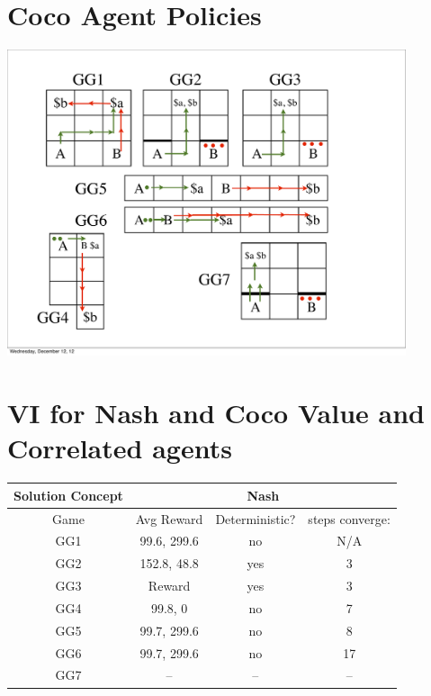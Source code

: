 \section{Coco Agent Policies}
\includegraphics[height=90mm]{text/games.pdf}

\section{VI for Nash and Coco Value  and Correlated agents}
\hspace{5mm}\begin{tabular}{||c||c|c|c||}
	\hline
	Solution Concept&  \multicolumn{3}{|c||}{Nash} \\ \hline
	Game & Avg Reward & Deterministic? & steps converge:  \\ \hline \hline
	GG1 & 99.6, 299.6 & no & N/A  \\ \hline
	GG2 & 152.8, 48.8 & yes & 3  \\ \hline
	GG3 & Reward & yes & 3 \\ \hline
	GG4 & 99.8, 0 & no & 7 \\ \hline
	GG5 & 99.7, 299.6 & no & 8 \\ \hline
	GG6 & 99.7, 299.6 & no & 17 \\ \hline
	GG7 & -- & -- & -- \\ \hline
\end{tabular}

\vspace{10mm}

